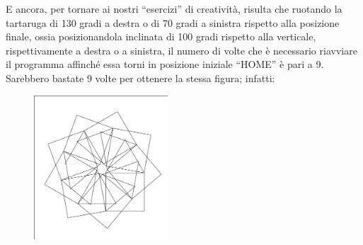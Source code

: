 E ancora, per tornare ai nostri “esercizi” di creatività, risulta che ruotando
la tartaruga di 130 gradi a destra o di 70 gradi a sinistra rispetto alla
posizione finale, ossia posizionandola inclinata di 100 gradi rispetto alla
verticale, rispettivamente a destra o a sinistra, il numero di volte che è
necessario riavviare il programma affinché essa torni in posizione iniziale
“HOME” è pari a 9. Sarebbero bastate 9 volte per ottenere la stessa figura;
infatti:

\begin{minipage}{0.5\textwidth}
\begin{figure}[H]
   \includegraphics[width=5.0cm,trim=4 4 6 4,clip]{./images/marta/mar-13.png}
   \label{mar-15}
\end{figure}
\end{minipage} \hfill
